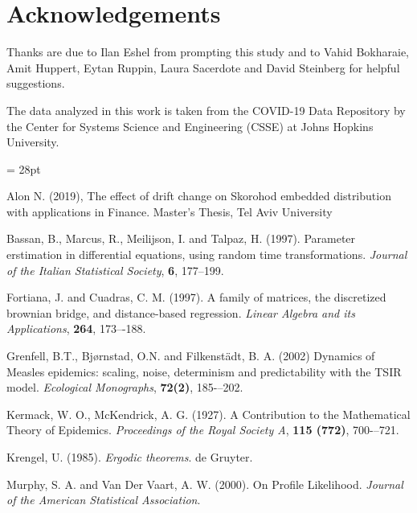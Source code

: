 \documentclass{article}
\begin{document}
\section*{Acknowledgements}

Thanks are due to Ilan Eshel from prompting this study and to Vahid
Bokharaie, Amit Huppert, Eytan Ruppin, Laura Sacerdote and David Steinberg for helpful suggestions.

The data analyzed in this work is taken from the COVID-19 Data Repository by
the Center for Systems Science and Engineering (CSSE) at Johns Hopkins
University.



\baselineskip= 28pt

\begin{thebibliography}{99}

 Alon N. (2019), The effect of drift change on Skorohod embedded
distribution with applications in Finance. Master’s Thesis, Tel Aviv
University

 Bassan, B., Marcus, R., Meilijson, I. and Talpaz, H. (1997). Parameter erstimation in differential equations, using random time transformations. {\em Journal of the Italian Statistical Society}, {\bf 6}, 177--199.

 Fortiana, J. and Cuadras, C. M. (1997). A family of matrices, the
discretized brownian bridge, and distance-based regression. {\em Linear
Algebra and its Applications}, {\bf 264}, 173–-188.

 Grenfell, B.T., Bj{\o}rnstad, O.N. and Filkenst\"{a}dt, B. A. (2002) Dynamics of Measles epidemics: scaling, noise, determinism and predictability with the TSIR model. {\em Ecological Monographs}, {\bf 72(2)}, 185-–202.

  Kermack, W. O., McKendrick, A. G. (1927). A Contribution to the Mathematical Theory of Epidemics. {\em Proceedings of the Royal Society A}, {\bf 115 (772)}, 700-–721.

 Krengel, U. (1985). {\em Ergodic theorems}. de Gruyter.

 Murphy, S. A. and  Van Der Vaart, A. W. (2000). On Profile Likelihood. {\em Journal of the American Statistical Association}.
\end{thebibliography}
\end{document}
